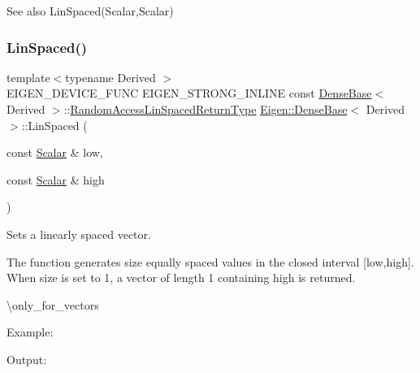 \begin{DoxySeeAlso}{See also}
Lin\+Spaced(\+Scalar,\+Scalar) 
\end{DoxySeeAlso}
\mbox{\label{class_eigen_1_1_dense_base_a1dd502457286f60df1c3e90f9192c542}} 
\subsubsection{\texorpdfstring{LinSpaced()}{LinSpaced()}\hspace{0.1cm}{\footnotesize\ttfamily [4/4]}}
{\footnotesize\ttfamily template$<$typename Derived $>$ \\
E\+I\+G\+E\+N\+\_\+\+D\+E\+V\+I\+C\+E\+\_\+\+F\+U\+NC E\+I\+G\+E\+N\+\_\+\+S\+T\+R\+O\+N\+G\+\_\+\+I\+N\+L\+I\+NE const \mbox{\hyperlink{class_eigen_1_1_dense_base}{Dense\+Base}}$<$ Derived $>$\+::\mbox{\hyperlink{class_eigen_1_1_cwise_nullary_op}{Random\+Access\+Lin\+Spaced\+Return\+Type}} \mbox{\hyperlink{class_eigen_1_1_dense_base}{Eigen\+::\+Dense\+Base}}$<$ Derived $>$\+::Lin\+Spaced (\begin{DoxyParamCaption}\item[{const \mbox{\hyperlink{class_eigen_1_1_dense_base_a5feed465b3a8e60c47e73ecce83e39a2}{Scalar}} \&}]{low,  }\item[{const \mbox{\hyperlink{class_eigen_1_1_dense_base_a5feed465b3a8e60c47e73ecce83e39a2}{Scalar}} \&}]{high }\end{DoxyParamCaption})\hspace{0.3cm}{\ttfamily [static]}}



Sets a linearly spaced vector. 

The function generates \textquotesingle{}size\textquotesingle{} equally spaced values in the closed interval \mbox{[}low,high\mbox{]}. When size is set to 1, a vector of length 1 containing \textquotesingle{}high\textquotesingle{} is returned.

\textbackslash{}only\+\_\+for\+\_\+vectors

Example\+: 
\begin{DoxyCodeInclude}{0}
\end{DoxyCodeInclude}
 Output\+: 
\begin{DoxyVerbInclude}
\end{DoxyVerbInclude}


